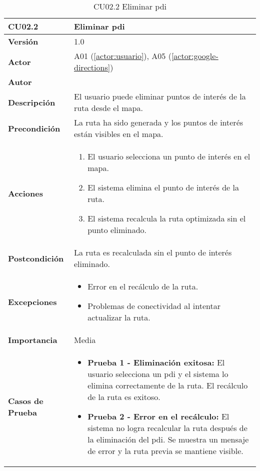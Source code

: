 

\begin{table}[H]
	\centering
	\begin{tabularx}{\linewidth}{ p{} p{} }
		\toprule
		\textbf{CU02.2}    & \textbf{Eliminar \acrlong{pdi}} \\
		\toprule
		\textbf{Versión}              & 1.0    \\
		\textbf{Actor}                & A01 (\ref{actor:usuario}), A05 (\ref{actor:google-directions}) \\
		\textbf{Autor}                & \autor \\
		\textbf{Descripción}          & El usuario puede eliminar puntos de interés de la ruta desde el mapa. \\
		\textbf{Precondición}         & La ruta ha sido generada y los puntos de interés están visibles en el mapa. \\
		\textbf{Acciones}             &
		\begin{enumerate}
			\def\labelenumi{\arabic{enumi}.}
			\tightlist
			\item El usuario selecciona un punto de interés en el mapa.
			\item El sistema elimina el punto de interés de la ruta.
			\item El sistema recalcula la ruta optimizada sin el punto eliminado.
		\end{enumerate}\\
		\textbf{Postcondición}        & La ruta es recalculada sin el punto de interés eliminado. \\
		\textbf{Excepciones}          & 
		\begin{itemize}
			\tightlist
			\item Error en el recálculo de la ruta.
			\item Problemas de conectividad al intentar actualizar la ruta.
		\end{itemize}\\
		\textbf{Importancia}          & Media \\
		\textbf{Casos de Prueba}      &
		\begin{itemize}
			\item \textbf{Prueba 1 - Eliminación exitosa:} El usuario selecciona un \acrshort{pdi} y el sistema lo elimina correctamente de la ruta. El recálculo de la ruta es exitoso.
			\vspace{2pt}
			\item \textbf{Prueba 2 - Error en el recálculo:} El sistema no logra recalcular la ruta después de la eliminación del \acrshort{pdi}. Se muestra un mensaje de error y la ruta previa se mantiene visible.
			\vspace{2pt}
		\end{itemize} \\
		\bottomrule
	\end{tabularx}
	\caption{CU02.2 Eliminar \acrlong{pdi}}
	\label{cu:eliminar-pdi}
\end{table}


